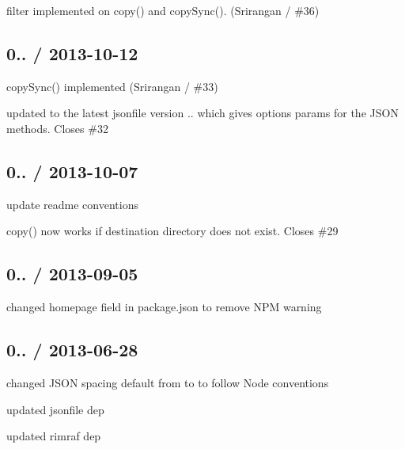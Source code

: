 \begin{DoxyItemize}
\item {\ttfamily filter} implemented on {\ttfamily copy()} and {\ttfamily copy\+Sync()}. (Srirangan / \#36)
\end{DoxyItemize}

\subsection*{0.. / 2013-\/10-\/12 }


\begin{DoxyItemize}
\item {\ttfamily copy\+Sync()} implemented (Srirangan / \#33)
\item updated to the latest {\ttfamily jsonfile} version {..} which gives {\ttfamily options} params for the J\+S\+O\+N methods. Closes \#32
\end{DoxyItemize}

\subsection*{0.. / 2013-\/10-\/07 }


\begin{DoxyItemize}
\item update readme conventions
\item {\ttfamily copy()} now works if destination directory does not exist. Closes \#29
\end{DoxyItemize}

\subsection*{0.. / 2013-\/09-\/05 }


\begin{DoxyItemize}
\item changed {\ttfamily homepage} field in package.\+json to remove N\+P\+M warning
\end{DoxyItemize}

\subsection*{0.. / 2013-\/06-\/28 }


\begin{DoxyItemize}
\item changed J\+S\+O\+N spacing default from {} to {} to follow Node conventions
\item updated {\ttfamily jsonfile} dep
\item updated {\ttfamily rimraf} dep
\end{DoxyItemize}

